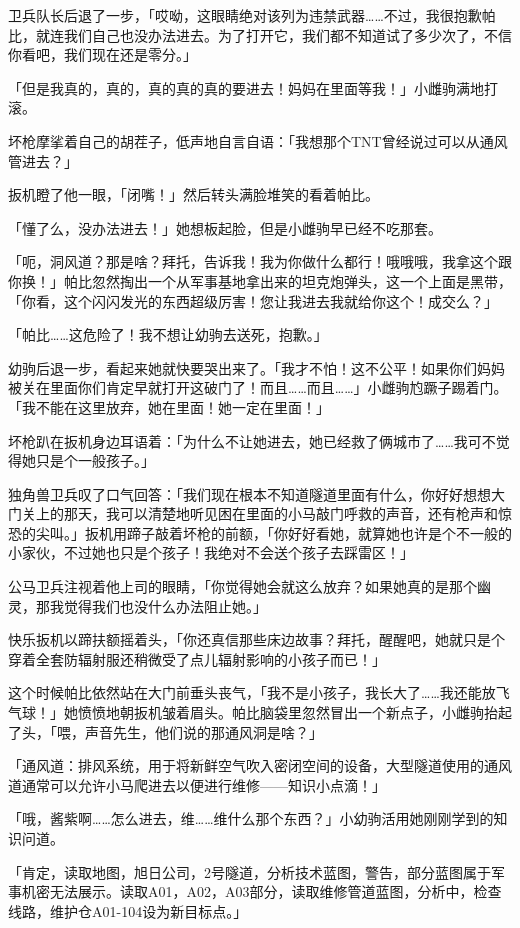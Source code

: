 卫兵队长后退了一步，「哎呦，这眼睛绝对该列为违禁武器……不过，我很抱歉帕比，就连我们自己也没办法进去。为了打开它，我们都不知道试了多少次了，不信你看吧，我们现在还是零分。」

「但是我真的，真的，真的真的真的要进去！妈妈在里面等我！」小雌驹满地打滚。

坏枪摩挲着自己的胡茬子，低声地自言自语：「我想那个TNT曾经说过可以从通风管进去？」

扳机瞪了他一眼，「闭嘴！」然后转头满脸堆笑的看着帕比。

「懂了么，没办法进去！」她想板起脸，但是小雌驹早已经不吃那套。

「呃，洞风道？那是啥？拜托，告诉我！我为你做什么都行！哦哦哦，我拿这个跟你换！」帕比忽然掏出一个从军事基地拿出来的坦克炮弹头，这一个上面是黑带，「你看，这个闪闪发光的东西超级厉害！您让我进去我就给你这个！成交么？」

「帕比……这危险了！我不想让幼驹去送死，抱歉。」

幼驹后退一步，看起来她就快要哭出来了。「我才不怕！这不公平！如果你们妈妈被关在里面你们肯定早就打开这破门了！而且……而且……」小雌驹尥蹶子踢着门。「我不能在这里放弃，她在里面！她一定在里面！」

坏枪趴在扳机身边耳语着：「为什么不让她进去，她已经救了俩城市了……我可不觉得她只是个一般孩子。」

独角兽卫兵叹了口气回答：「我们现在根本不知道隧道里面有什么，你好好想想大门关上的那天，我可以清楚地听见困在里面的小马敲门呼救的声音，还有枪声和惊恐的尖叫。」扳机用蹄子敲着坏枪的前额，「你好好看她，就算她也许是个不一般的小家伙，不过她也只是个孩子！我绝对不会送个孩子去踩雷区！」

公马卫兵注视着他上司的眼睛，「你觉得她会就这么放弃？如果她真的是那个幽灵，那我觉得我们也没什么办法阻止她。」

快乐扳机以蹄扶额摇着头，「你还真信那些床边故事？拜托，醒醒吧，她就只是个穿着全套防辐射服还稍微受了点儿辐射影响的小孩子而已！」

这个时候帕比依然站在大门前垂头丧气，「我不是小孩子，我长大了……我还能放飞气球！」她愤愤地朝扳机皱着眉头。帕比脑袋里忽然冒出一个新点子，小雌驹抬起了头，「喂，声音先生，他们说的那通风洞是啥？」

「{\mt 通风道：排风系统，用于将新鲜空气吹入密闭空间的设备，大型隧道使用的通风道通常可以允许小马爬进去以便进行维修——知识小点滴！}」

「哦，酱紫啊……怎么进去，维……维什么那个东西？」小幼驹活用她刚刚学到的知识问道。

「{\mt 肯定，读取地图，旭日公司，2号隧道，分析技术蓝图，警告，部分蓝图属于军事机密无法展示。读取A01，A02，A03部分，读取维修管道蓝图，分析中，检查线路，维护仓A01-104设为新目标点。}」

